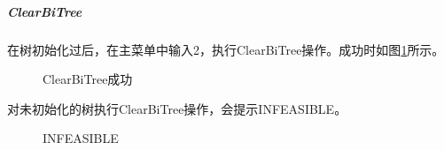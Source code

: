 \documentclass[supercite]{Experimental_Report}
\theoremstyle{definition}
\begin{document}
\clearpage
\subparagraph{ClearBiTree}
\noindent
在树初始化过后，在主菜单中输入2，执行ClearBiTree操作。成功时如图\ref{fig5-6}所示。
\begin{figure}[htbp]
	\centering
	\centering
	\caption{ClearBiTree成功}
	\label{fig5-6}
\end{figure}

\noindent
对未初始化的树执行ClearBiTree操作，会提示INFEASIBLE。
\begin{figure}[htbp]
	\centering
	\centering
	\caption{INFEASIBLE}
	\label{fig5-7}
\end{figure}
\end{document}
